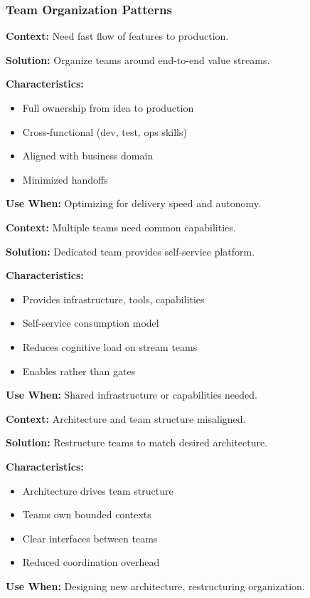 \documentclass[11pt,letterpaper]{article}
\begin{document}
\subsubsection{Team Organization Patterns}

\begin{patternbox}
\textbf{Context:} Need fast flow of features to production.

\textbf{Solution:} Organize teams around end-to-end value streams.

\textbf{Characteristics:}
\begin{itemize}[nosep]
    \item Full ownership from idea to production
    \item Cross-functional (dev, test, ops skills)
    \item Aligned with business domain
    \item Minimized handoffs
\end{itemize}

\textbf{Use When:} Optimizing for delivery speed and autonomy.
\end{patternbox}

\begin{patternbox}
\textbf{Context:} Multiple teams need common capabilities.

\textbf{Solution:} Dedicated team provides self-service platform.

\textbf{Characteristics:}
\begin{itemize}[nosep]
    \item Provides infrastructure, tools, capabilities
    \item Self-service consumption model
    \item Reduces cognitive load on stream teams
    \item Enables rather than gates
\end{itemize}

\textbf{Use When:} Shared infrastructure or capabilities needed.
\end{patternbox}

\begin{patternbox}
\textbf{Context:} Architecture and team structure misaligned.

\textbf{Solution:} Restructure teams to match desired architecture.

\textbf{Characteristics:}
\begin{itemize}[nosep]
    \item Architecture drives team structure
    \item Teams own bounded contexts
    \item Clear interfaces between teams
    \item Reduced coordination overhead
\end{itemize}

\textbf{Use When:} Designing new architecture, restructuring organization.
\end{patternbox}
\end{document}
